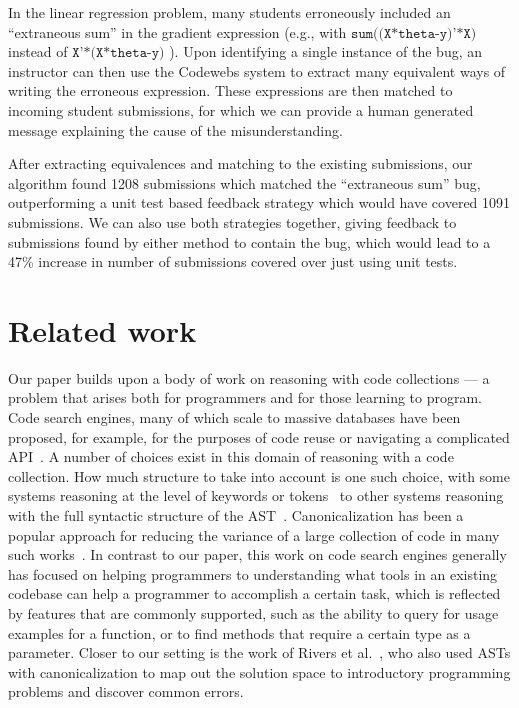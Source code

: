 In the linear regression problem, many students
erroneously included an ``extraneous sum'' in the gradient expression
(e.g., with $\texttt{sum((X*theta-y)'*X)}$ instead of   $\texttt{X'*(X*theta-y)}$ ). 
Upon identifying a single instance of the bug, an instructor can then use
the Codewebs system 
to extract many equivalent ways of writing the erroneous expression. These expressions are then matched to incoming student submissions, for which we can
provide a human generated message explaining the cause of the misunderstanding.

After extracting equivalences and matching to the existing submissions, our algorithm
found 1208 submissions which matched the ``extraneous sum'' bug, outperforming a unit test based
feedback strategy which would have covered 1091 submissions.  We can also use both strategies together, giving feedback to submissions found by either
method to contain the bug, 
which would lead to a 47\% increase in number of submissions covered over just using unit tests.

\section{Related work}\label{sec:relatedwork}
Our paper builds upon a body of work on reasoning with code collections --- a problem that arises
both for programmers and for those learning to program.  
Code search engines, many of which scale to massive databases 
have been proposed, for example, for the purposes of code reuse or navigating a complicated API~\cite{sindhgatta06,hoffmann07}.
A number of choices exist in this domain of reasoning with a code collection.
How much structure to take into account is one such choice, 
with some systems reasoning at the level of keywords or tokens~\cite{hummel08, hartmann10} to other systems reasoning
with the full syntactic 
structure of the AST~\cite{paul94, thummalapenta07,kim10}.
Canonicalization has been a popular approach for reducing the variance of a large collection of code  in many such works~\cite{baxter98,xu03}.
In contrast to our paper, this work on code search engines generally has focused on helping programmers to understanding what tools in an existing 
codebase can help a programmer to accomplish 
a certain task, which is reflected by features that are commonly supported, such as the ability to query for usage examples for a function, 
or to find methods that require a certain type as a parameter.  
Closer to our setting is the work of Rivers et al.~\cite{rivers12,rivers13}, who also used ASTs with canonicalization to map out the solution space to 
introductory programming problems and discover common errors.


